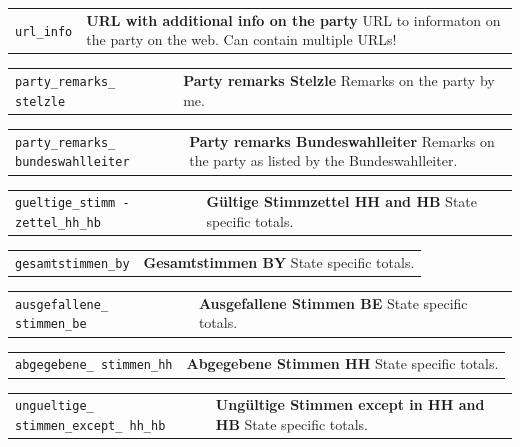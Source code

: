 \documentclass[
  a4paper,
  DIV=11,
  numbers=noendperiod]{scrartcl}
\begin{document}
\begin{longtable*}{p{3.2cm}| p{11cm}}
\texttt{url\_info} &\textbf{URL with additional info on the party}\newline 
URL to informaton on the party on the web. Can contain multiple URLs!
\end{longtable*}

\begin{longtable*}{p{3.2cm}| p{11cm}}
\texttt{party\_remarks\_
stelzle} &\textbf{Party remarks Stelzle}\newline 
Remarks on the party by me.
\end{longtable*}

\begin{longtable*}{p{3.2cm}| p{11cm}}
\texttt{party\_remarks\_
bundeswahlleiter} &\textbf{Party remarks Bundeswahlleiter}\newline 
Remarks on the party as listed by the Bundeswahlleiter.
\end{longtable*}

\begin{longtable*}{p{3.2cm}| p{11cm}}
\texttt{gueltige\_stimm
-zettel\_hh\_hb} &\textbf{Gültige Stimmzettel HH and HB}\newline 
State specific totals.
\end{longtable*}

\begin{longtable*}{p{3.2cm}| p{11cm}}
\texttt{gesamtstimmen\_by} &\textbf{Gesamtstimmen BY}\newline 
State specific totals.
\end{longtable*}

\begin{longtable*}{p{3.2cm}| p{11cm}}
\texttt{ausgefallene\_
stimmen\_be} &\textbf{Ausgefallene Stimmen BE}\newline 
State specific totals.
\end{longtable*}

\begin{longtable*}{p{3.2cm}| p{11cm}}
\texttt{abgegebene\_
stimmen\_hh} &\textbf{Abgegebene Stimmen HH}\newline 
State specific totals.
\end{longtable*}

\begin{longtable*}{p{3.2cm}| p{11cm}}
\texttt{ungueltige\_
stimmen\_except\_
hh\_hb} &\textbf{Ungültige Stimmen except in HH and HB}\newline 
State specific totals.
\end{longtable*}
\end{document}
